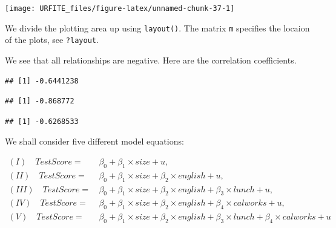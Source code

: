 \documentclass[]{book}
\newenvironment{Shaded}{\begin{snugshade}}{\end{snugshade}}
\newcommand{\KeywordTok}[1]{\textcolor[rgb]{0.13,0.29,0.53}{\textbf{#1}}}
\newcommand{\CommentTok}[1]{\textcolor[rgb]{0.56,0.35,0.01}{\textit{#1}}}
\newcommand{\OperatorTok}[1]{\textcolor[rgb]{0.81,0.36,0.00}{\textbf{#1}}}
\newcommand{\NormalTok}[1]{#1}
\theoremstyle{definition}
\theoremstyle{definition}
\theoremstyle{definition}
\theoremstyle{remark}
\begin{document}
\begin{center}\texttt{[image: URFITE\_files/figure-latex/unnamed-chunk-37-1]} \end{center}

We divide the plotting area up using \texttt{layout()}. The matrix
\texttt{m} specifies the locaion of the plots, see \texttt{?layout}.

We see that all relationships are negative. Here are the correlation
coefficients.

\begin{Shaded}
\end{Shaded}

\begin{verbatim}
## [1] -0.6441238
\end{verbatim}

\begin{Shaded}
\end{Shaded}

\begin{verbatim}
## [1] -0.868772
\end{verbatim}

\begin{Shaded}
\end{Shaded}

\begin{verbatim}
## [1] -0.6268533
\end{verbatim}

We shall consider five different model equations:

\begin{align*}
  (I) \quad TestScore=& \, \beta_0 + \beta_1 \times size + u, \\
  (II) \quad TestScore=& \, \beta_0 + \beta_1 \times size + \beta_2 \times english + u, \\
  (III) \quad TestScore=& \, \beta_0 + \beta_1 \times size + \beta_2 \times english + \beta_3 \times lunch + u, \\
  (IV) \quad TestScore=& \, \beta_0 + \beta_1 \times size + \beta_2 \times english + \beta_4 \times calworks + u, \\
  (V) \quad TestScore=& \, \beta_0 + \beta_1 \times size + \beta_2 \times english + \beta_3 \times lunch + \beta_4 \times calworks + u
\end{align*}
\end{document}

